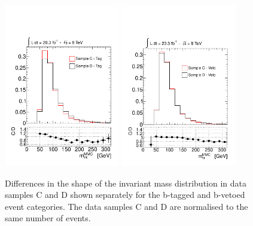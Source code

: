 \begin{figure}[p]
	\begin{center}
	\includegraphics[width=0.45\textwidth]{figure/systematics/qcd_shape_tag.pdf}
	\includegraphics[width=0.45\textwidth]{figure/systematics/qcd_shape_veto.pdf}
	\end{center}
	\caption{Differences in the shape of the invariant \mmc mass distribution in data samples  C and D shown 
	separately for the b-tagged  and b-vetoed event categories. The data samples C and D are normalised to the same 
	number of events.}
	\label{fig:qcd_shape_unc}
\end{figure}


